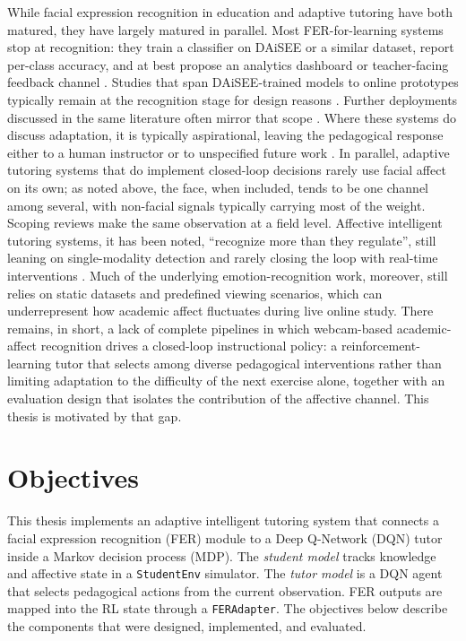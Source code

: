 While facial expression recognition in education and adaptive tutoring have both matured, they have largely matured in parallel. Most FER-for-learning systems stop at recognition: they train a classifier on DAiSEE or a similar dataset, report per-class accuracy, and at best propose an analytics dashboard or teacher-facing feedback channel \cite{leong_deep_2020,rao_recognition_2021,mehta_three-dimensional_2022}. Studies that span DAiSEE-trained models to online prototypes typically remain at the recognition stage for design reasons \cite{komaravalli_detecting_2023,liu_dynamic_nodate,aly_revolutionizing_2025}. Further deployments discussed in the same literature often mirror that scope \cite{aly_enhancing_2023}. Where these systems do discuss adaptation, it is typically aspirational, leaving the pedagogical response either to a human instructor or to unspecified future work \cite{asaju_adaptive_2022,aly_comprehensive_2025,Prabakaran2025FacialExpressionAdaptiveTeaching}. In parallel, adaptive tutoring systems that do implement closed-loop decisions rarely use facial affect on its own; as noted above, the face, when included, tends to be one channel among several, with non-facial signals typically carrying most of the weight. Scoping reviews make the same observation at a field level. Affective intelligent tutoring systems, it has been noted, ``recognize more than they regulate'', still leaning on single-modality detection and rarely closing the loop with real-time interventions \cite{yuvaraj_affective_2025}. Much of the underlying emotion-recognition work, moreover, still relies on static datasets and predefined viewing scenarios, which can underrepresent how academic affect fluctuates during live online study. There remains, in short, a lack of complete pipelines in which webcam-based academic-affect recognition drives a closed-loop instructional policy: a reinforcement-learning tutor that selects among diverse pedagogical interventions rather than limiting adaptation to the difficulty of the next exercise alone, together with an evaluation design that isolates the contribution of the affective channel. This thesis is motivated by that gap.

\section{Objectives}\label{sec:objectives}

This thesis implements an adaptive intelligent tutoring system that connects a facial expression recognition (FER) module to a Deep Q-Network (DQN) tutor inside a Markov decision process (MDP). The \emph{student model} tracks knowledge and affective state in a \texttt{StudentEnv} simulator. The \emph{tutor model} is a DQN agent that selects pedagogical actions from the current observation. FER outputs are mapped into the RL state through a \texttt{FERAdapter}. The objectives below describe the components that were designed, implemented, and evaluated.

